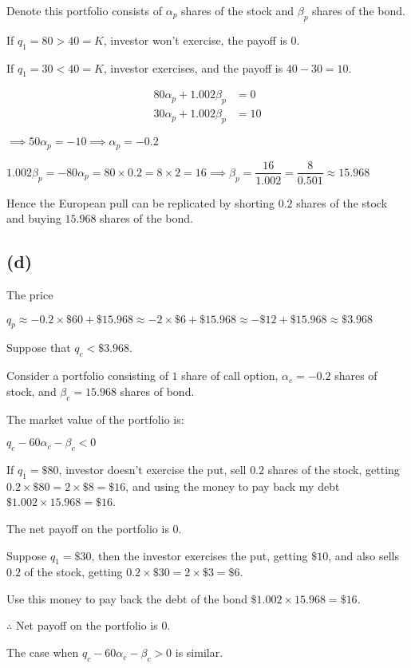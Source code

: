 \documentclass{article}
\begin{document}
Denote this portfolio consists of $\alpha_{p}$ shares of the stock and $\beta_{p}$ shares of the bond.

If $q_{1}=80>40=K$, investor won't exercise, the payoff is $0$.

If $q_{1}=30<40=K$, investor exercises, and the payoff is $40-30=10$. 

\begin{align*} 
    80\alpha_{p} + 1.002\beta_{p} &=  0 \\ 
    30\alpha_{p} + 1.002\beta_{p} &=  10
\end{align*}

$\implies 50\alpha_{p}=-10\implies\alpha_{p}=-0.2$

$1.002\beta_{p}=-80\alpha_{p}=80\times0.2=8\times2=16\implies\beta_{p}=\dfrac{16}{1.002}=\dfrac{8}{0.501}\approx15.968$

Hence the European pull can be replicated by shorting $0.2$ shares of the stock and buying $15.968$ shares of the bond.

\subsection*{(d)}

The price

$q_{p}\approx-0.2\times\$60+\$15.968\approx-2\times\$6+\$15.968\approx-\$12+\$15.968\approx\$3.968$

Suppose that $q_{c}<\$3.968$.

Consider a portfolio consisting of $1$ share of call option, $\alpha_{c}=-0.2$ shares of stock, and $\beta_{c}=15.968$ shares of bond.

The market value of the portfolio is:

$q_{c}-60\alpha_{c}-\beta_{c}<0$

If $q_{1}=\$80$, investor doesn't exercise the put, sell $0.2$ shares of the stock, getting $0.2\times\$80=2\times\$8=\$16$, and using the money to pay back my debt $\$1.002\times15.968=\$16$.

The net payoff on the portfolio is $0$.

Suppose $q_{1}=\$30$, then the investor exercises the put, getting $\$10$, and also sells $0.2$ of the stock, getting $0.2\times\$30=2\times\$3=\$6$.

Use this money to pay back the debt of the bond $\$1.002\times15.968=\$16$.

$\therefore$ Net payoff on the portfolio is $0$.

The case when $q_{c}-60\alpha_{c}-\beta_{c}>0$ is similar.
\end{document}
